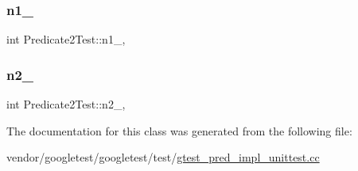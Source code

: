\subsubsection{\texorpdfstring{n1\+\_\+}{n1\_}}
{\footnotesize\ttfamily int Predicate2\+Test\+::n1\+\_\+\hspace{0.3cm}{\ttfamily [static]}, {\ttfamily [protected]}}

\mbox{\label{class_predicate2_test_a9dbe5173570b9b911af2df889c287027}} 
\subsubsection{\texorpdfstring{n2\+\_\+}{n2\_}}
{\footnotesize\ttfamily int Predicate2\+Test\+::n2\+\_\+\hspace{0.3cm}{\ttfamily [static]}, {\ttfamily [protected]}}



The documentation for this class was generated from the following file\+:\begin{DoxyCompactItemize}
\item 
vendor/googletest/googletest/test/\hyperlink{gtest__pred__impl__unittest_8cc}{gtest\+\_\+pred\+\_\+impl\+\_\+unittest.\+cc}\end{DoxyCompactItemize}
